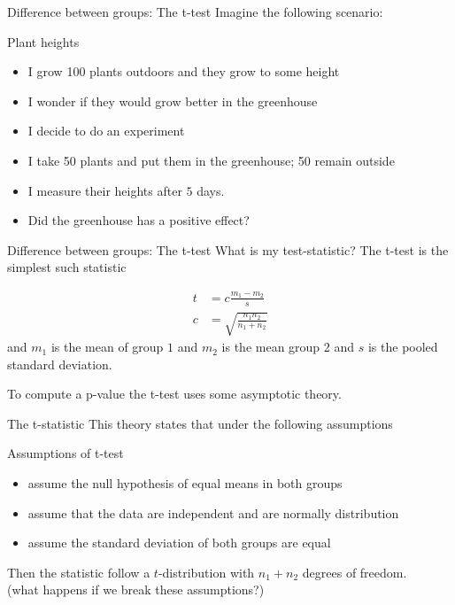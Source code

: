 \documentclass{bredelebeamer}
\begin{document}
\begin{frame}{Difference between groups: The t-test}
Imagine the following scenario:
\begin{block}{Plant heights}
	\begin{itemize}
		\item I grow 100 plants outdoors and they grow to some height
		\item I wonder if they would grow better in the greenhouse
		\item I decide to do an experiment
		\item I take 50 plants and put them in the greenhouse; 50 remain outside
		\item I measure their heights after $5$ days.
		\item Did the greenhouse has a positive effect?
	\end{itemize}

\end{block}
\end{frame}

\begin{frame}{Difference between groups: The t-test}
What is my test-statistic? The t-test is the simplest such statistic

\begin{align}
t &= c\frac{m_1 - m_2}{s} \\
c & = \sqrt{\frac{n_1 n_2}{n_1 + n_2}}
\end{align}
and $m_1$ is the mean of group $1$ and $m_2$ is the mean group 2 and $s$ is the pooled standard deviation.

To compute a p-value the t-test uses some asymptotic theory.  
\end{frame}


\begin{frame}{The t-statistic}
This theory states that under the following assumptions
\begin{block}{Assumptions of t-test}

\begin{itemize}
	\item assume the null hypothesis of equal means in both groups
\item assume that the data are independent and are normally distribution
\item assume the standard deviation of both groups are equal
\end{itemize}

\end{block}
Then the statistic follow a $t$-distribution with $n_1 + n_2$ degrees of freedom.
\\
(what happens if we break these assumptions?)
\end{frame}
\end{document}
